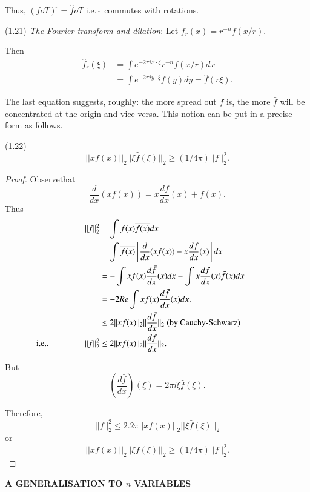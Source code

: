 Thus, $(f o T)^{\hat{~}} = \hat{f} o T$ i.e. ${\hat{~}}$ commutes
with rotations. 

\noindent (1.21) \qquad 
{\em The Fourier transform and dilation}: Let $f_r (x) = r^{-n} f(x/r)$.

Then 
\begin{align*}
  \hat{f}_r (\xi) & = \int e^{-2 \pi ix \cdot \xi } r^{-n} f(x/r)dx \\
  & = \int e^{-2 \pi iy\cdot \xi } f(y)dy = \hat{f}(r \xi). 
\end{align*}

The last equation suggests, roughly: the more spread out $f$ is, the
more $\hat{f}$ will be concentrated at the origin and vice versa. This
notion can be put in a precise form as follows. 

\noindent (1.22) 
$$
||xf(x)||_2 || \xi \hat{f}(\xi) ||_2 \geq (1/4 \pi) ||f||^2_2.
$$
\begin{proof}
  Observe\pageoriginale that 
  $$
  \frac{d}{dx}(xf(x)) = x \frac{df}{dx}(x) + f(x).
  $$
  Thus 
{%
  \begin{align*}
    ||f||^2_2 & = \int f(x) \overline{f(x)} dx \\
    & = \int \overline{f(x)} \left[\frac{d}{dx}(xf(x)) - x
      \frac{df}{dx}(x)\right] dx \\
    & = -\int xf(x) \frac{d\bar{f}}{dx}(x) dx - \int x \frac{df}{dx}(x)
    \bar{f}(x) dx \\ 
    & = -2 Re \int x f(x) \frac{d\bar{f}}{dx}(x) dx.\\
    & \leq 2|| xf(x) ||_2 ||\frac{d\bar{f}}{dx}||_2 ~\text{(by
      Cauchy-Schwarz) }\hspace{1.5cm}\\ 
    \text{i.e.,} \hspace{1.5cm} ||f||^2_2  &\leq 2
    ||xf(x)||_2||\frac{df}{dx}||_2. 
  \end{align*}}\relax
  
  But 
  $$
  (\frac{d\bar{f}}{dx})^{\hat{}}(\xi) = 2 \pi i \xi \hat{f}(\xi).
  $$

  Therefore,
  $$
  || f ||^2_2 \leq 2.2 \pi ||xf(x)||_2 || \xi \hat{f}(\xi) ||_2
  $$
  or 
  $$
  ||xf(x)||_2 || \xi f (\xi) ||_2 \geq (1/4 \pi) ||f||^2_2.
  $$
\end{proof}

\eject

\noindent
\textbf{A GENERALISATION TO $n$ VARIABLES }
\medskip

